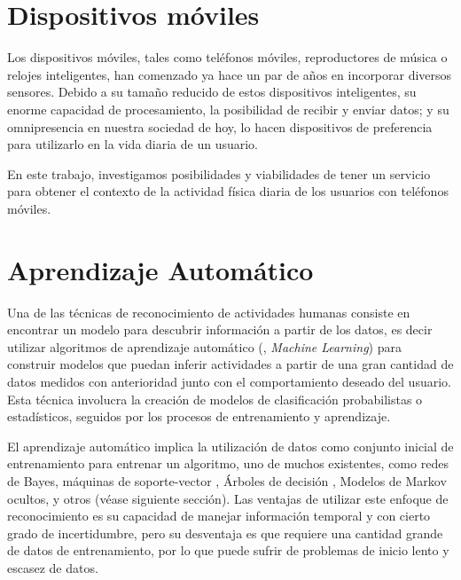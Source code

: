 \section{Dispositivos móviles}

\label{sec24:dispositivos-moviles} Los dispositivos móviles, tales
como teléfonos móviles, reproductores de música o relojes inteligentes,
han comenzado ya hace un par de años en incorporar diversos sensores.
Debido a su tamaño reducido de estos dispositivos inteligentes, su
enorme capacidad de procesamiento, la posibilidad de recibir y enviar
datos; y su omnipresencia en nuestra sociedad de hoy, lo hacen dispositivos
de preferencia para utilizarlo en la vida diaria de un usuario.

En este trabajo, investigamos posibilidades y viabilidades de tener
un servicio para obtener el contexto de la actividad física diaria
de los usuarios con teléfonos móviles.


\section{Aprendizaje Automático}

\label{sec25:aprendizaje-automatico}Una de las técnicas de reconocimiento
de actividades humanas consiste en encontrar un modelo para descubrir
información a partir de los datos, es decir utilizar algoritmos de
aprendizaje automático (, \emph{Machine Learning}) para
construir modelos que puedan inferir actividades a partir de una gran
cantidad de datos medidos con anterioridad junto con el comportamiento
deseado del usuario\cite{Chen2012}. Esta técnica involucra la creación
de modelos de clasificación probabilistas o estadísticos, seguidos
por los procesos de entrenamiento y aprendizaje.

El aprendizaje automático implica la utilización de datos como conjunto
inicial de entrenamiento para entrenar un algoritmo, uno de muchos
existentes, como redes de Bayes, máquinas de soporte-vector ,
Árboles de decisión , Modelos de Markov ocultos,
y otros \cite{Rajaraman2011} (véase siguiente sección). Las ventajas
de utilizar este enfoque de reconocimiento es su capacidad de manejar
información temporal y con cierto grado de incertidumbre, pero su
desventaja es que requiere una cantidad grande de datos de entrenamiento,
por lo que puede sufrir de problemas de inicio lento y escasez de
datos.


